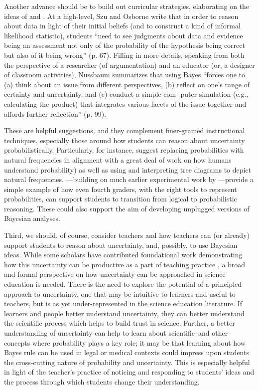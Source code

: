 \documentclass[man]{apa7}
\begin{document}
Another advance should be to build out curricular strategies, elaborating on the ideas of \textcite{so12} and \textcite{n11}. At a high-level, Szu and Osborne write that in order to reason about data in light of their initial beliefs (and to construct a kind of informal likelihood statistic), students “need to see judgments about data and evidence being an assessment not only of the probability of the hypothesis being correct but also of it being wrong” (p. 67). Filling in more details, speaking from both the perspective of a researcher (of argumentation) and an educator (or, a designer of classroom activities), Nussbaum summarizes that using Bayes “forces one to (a) think about an issue from different perspectives, (b) reflect on one’s range of certainty and uncertainty, and (c) conduct a simple com- puter simulation (e.g., calculating the product) that integrates various facets of the issue together and affords further reflection” (p. 99). 

These are helpful suggestions, and they complement finer-grained instructional techniques, especially those around how students can reason about uncertainty probabilistically. Particularly, \textcite{bkbm18} for instance, suggest replacing probabilities with natural frequencies in alignment with a great deal of work on how humans understand probability) \parencite{gh95} as well as using and interpreting tree diagrams to depict natural frequencies. \textcite{me14}—building on much earlier experimental work by \textcite{wason1971natural}—provide a simple example of how even fourth graders, with the right tools to represent probabilities, can support students to transition from logical to probabilistic reasoning. These could also support the aim of developing unplugged versions of Bayesian analyses. 

Third, we should, of course, consider teachers and how teachers can (or already) support students to reason about uncertainty, and, possibly, to use Bayesian ideas. While some scholars have contributed foundational work demonstrating how this uncertainty can be productive as a part of teaching practice \parencite{manz2018supporting}, a broad and formal perspective on how uncertainty can be approached in science education is needed. There is the need to explore the potential of a principled approach to uncertainty, one that may be intuitive to learners and useful to teachers, but is as yet under-represented in the science education literature. If learners and people better understand uncertainty, they can better understand the scientific process which helps to build trust in science. Further, a better understanding of uncertainty can help to learn about scientific--and other--concepts where probability plays a key role; it may be that learning about how Bayes rule can be used in legal or medical contexts could impress upon students the cross-cutting nature of probability and uncertainty. This is especially helpful in light of the teacher's practice of noticing and responding to students' ideas and the process through which students change their understanding.
\end{document}

